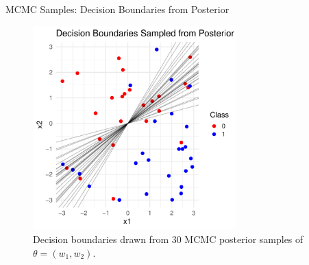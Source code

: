\documentclass{beamer}
\begin{document}
\begin{frame}{MCMC Samples: Decision Boundaries from Posterior}
  \begin{figure}
    \centering
    \includegraphics[width=0.7\textwidth]{mcmc.pdf}
    \caption{Decision boundaries drawn from 30 MCMC posterior samples of \(\theta = (w_1, w_2)\).}
  \end{figure}
\end{frame}
\end{document}
